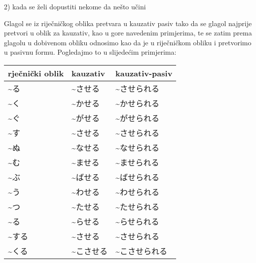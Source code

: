 	2) kada se želi dopustiti nekome da nešto učini
	
	\begin{reibun}
	\end{reibun}
	
	\newpage
	
		
	Glagol se iz riječničkog oblika pretvara u kauzativ pasiv tako da se glagol najprije pretvori u oblik za kauzativ, kao u gore navedenim primjerima, te se zatim prema glagolu u dobivenom obliku odnosimo kao da je u riječničkom obliku i pretvorimo u pasivnu formu. Pogledajmo to u slijedećim primjerima:
		
	\begin{table}[h]
		\centering
		\begin{tabular}{l l l}\toprule[2pt]
			rječnički oblik & kauzativ & kauzativ-pasiv\\
			\midrule
			\textasciitilde る & \textasciitilde させる & \textasciitilde させられる\\
			\textasciitilde く & \textasciitilde かせる & \textasciitilde かせられる\\
			\textasciitilde ぐ & \textasciitilde がせる & \textasciitilde がせられる\\
			\textasciitilde す & \textasciitilde させる & \textasciitilde させられる\\
			\textasciitilde ぬ & \textasciitilde なせる & \textasciitilde なせられる\\
			\textasciitilde む & \textasciitilde ませる & \textasciitilde ませられる\\
			\textasciitilde ぶ & \textasciitilde ばせる & \textasciitilde ばせられる\\
			\textasciitilde う & \textasciitilde わせる & \textasciitilde わせられる\\
			\textasciitilde つ & \textasciitilde たせる & \textasciitilde たせられる\\
			\textasciitilde る & \textasciitilde らせる & \textasciitilde らせられる\\
			\textasciitilde する　& \textasciitilde させる & \textasciitilde させられる\\
			\textasciitilde くる　&\textasciitilde こさせる & \textasciitilde こさせられる\\
			\bottomrule[2pt]
		\end{tabular}
	\end{table}
	

